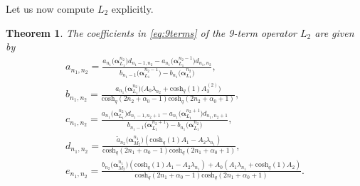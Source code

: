 \documentclass[pdftex]{sigma}
\numberwithin{equation}{section}
\newtheorem{Theorem}{Theorem}[section]
\newcommand{\chq}{\mathrm{cosh}_q}
\begin{document}
Let us now compute $L_2$ explicitly.
\begin{Theorem}The coefficients in \eqref{eq:9terms} of the 9-term operator $L_2$ are given by
	\begin{gather*}
		a_{n_1,n_2} = \frac{a_{n_1}\big(\bm{\alpha}_{L_1}^{n_2}\big)d_{n_1-1,n_2}-a_{n_1}\big(\bm{\alpha}_{L_1}^{n_2-1}\big)d_{n_1,n_2}} {b_{n_1-1}\big(\bm{\alpha}_{L_1}^{n_2-1}\big)-b_{n_1}\big(\bm{\alpha}_{L_1}^{n_2}\big)} ,\\ %
		b_{n_1,n_2} = \frac{a_{n_1}\big(\bm{\alpha}_{L_1}^{n_2}\big)\big(A_0\lambda_{n_2} +\chq(1)A_3^{(2)}\big)}{\chq(2n_2+\alpha_0-1)\chq(2n_2+\alpha_0+1)} ,\\
		c_{n_1,n_2} = \frac{a_{n_1}\big(\bm{\alpha}_{L_1}^{n_2}\big)d_{n_1-1,n_2+1}-a_{n_1}\big(\bm{\alpha}_{L_1}^{n_2+1}\big)d_{n_1,n_2+1}}{b_{n_1-1}\big(\bm{\alpha}_{L_1}^{n_2+1}\big) -b_{n_1}\big(\bm{\alpha}_{L_1}^{n_2}\big)} ,\\
d_{n_1,n_2} =\frac{\tilde{a}_{n_2}\big(\bm{\alpha}_{M_2}^{n_1}\big) (\chq(1)A_1-A_2\lambda_{n_1} )}{\chq(2n_1+\alpha_0-1)\chq(2n_1+\alpha_0+1)} ,\\
e_{n_1,n_2} =\frac{b_{n_2}\big(\bm{\alpha}_{M_2}^{n_1}\big) (\chq(1)A_1-A_2\lambda_{n_1})+A_0(A_1\lambda_{n_1}+\chq(1)A_2 )}{\chq(2n_1+\alpha_0-1)\chq(2n_1+\alpha_0+1)} .%
	\end{gather*}
\end{Theorem}
\end{document}
